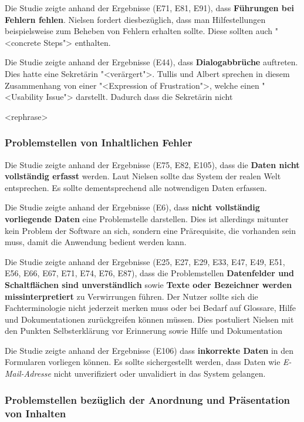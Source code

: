 Die Studie zeigte anhand der Ergebnisse (E71, E81, E91), dass \textbf{Führungen bei Fehlern fehlen}. Nielsen fordert diesbezüglich, dass man Hilfestellungen beispielsweise zum Beheben von Fehlern erhalten sollte. Diese sollten auch "<concrete Steps"> enthalten. \cite{Nielsen10}

Die Studie zeigte anhand der Ergebnisse (E44), dass \textbf{Dialogabbrüche} auftreten. Dies hatte eine Sekretärin "<verärgert">. Tullis und Albert sprechen in diesem Zusammenhang von einer "<Expression of Frustration">, welche einen "<Usability Issue"> darstellt.\cite{TullisAlbert} Dadurch dass die Sekretärin nicht 

<rephrase> 
\subsubsection{Problemstellen von Inhaltlichen Fehler}
Die Studie zeigte anhand der Ergebnisse (E75, E82, E105), dass die \textbf{Daten nicht vollständig erfasst} werden. Laut Nielsen sollte das System der realen Welt entsprechen.\cite{Nielsen10} Es sollte dementsprechend alle notwendigen Daten erfassen.

Die Studie zeigte anhand der Ergebnisse (E6), dass \textbf{nicht vollständig vorliegende Daten} eine Problemstelle darstellen. Dies ist allerdings mitunter kein Problem der Software an sich, sondern eine Prärequisite, die vorhanden sein muss, damit die Anwendung bedient werden kann.

Die Studie zeigte anhand der Ergebnisse (E25, E27, E29, E33, E47, E49, E51, E56, E66, E67, E71, E74, E76, E87), dass die Problemstellen \textbf{Datenfelder und Schaltflächen sind unverständlich} sowie \textbf{Texte oder Bezeichner werden missinterpretiert} zu Verwirrungen führen. Der Nutzer sollte sich die Fachterminologie nicht jederzeit merken muss oder bei Bedarf auf Glossare, Hilfe und Dokumentationen zurückgreifen können müssen. Dies postuliert Nielsen mit den Punkten \glqq Selbsterklärung vor Erinnerung\grqq{} sowie \glqq Hilfe und Dokumentation\grqq{} \cite{Nielsen10}

Die Studie zeigte anhand der Ergebnisse (E106) dass \textbf{inkorrekte Daten} in den Formularen vorliegen können. Es sollte sichergestellt werden, dass Daten wie \textit{E-Mail-Adresse} nicht unverifiziert oder unvalidiert in das System gelangen.

\subsubsection{Problemstellen bezüglich der Anordnung und Präsentation von Inhalten}

